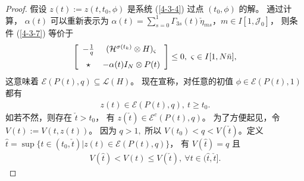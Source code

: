 \begin{proof}
    假设 $z(t):=z(t,t_0,\phi)$ 是系统 (\ref{4-3-4})  过点 $(t_0,\phi)$ 的解。 通过计算， $\alpha(t)$ 可以重新表示为 $\alpha(t)=\sum\limits_{s=0}^{1}\varGamma_{3 s}(t)\check{\eta}_{ms}$，$m\in I[1,\mathcal{J}_0]$， 则条件 (\ref{4-3-7}) 等价于
    \begin{align*} 
    \left[ \begin{array}{cc}
    -\frac{1}{q}&  (\mathcal{H}^{\sigma(t_k)}\otimes H)_\varsigma\vspace{0.2cm}\\
    \star&- \alpha(t)I_N\otimes  P(t)   \\
    \end{array}
    \right]\leq 0,\ \varsigma\in I[1,N\bar{n} ],
    \end{align*} 
    这意味着 
    $\mathscr{E} ( P(t),q)\subseteq \mathscr{L}(H)$。  现在宣称，对任意的初值 $\phi\in \mathscr{E}( P(t),1)$ 都有 
    \begin{align}\label{4-3-11} z(t)\in \mathscr{E}(P(t),q),\ t\geq t_0.
    \end{align} 
    如若不然，则存在 $\check{t}>t_0$， 有 $z(\check{t})\in \mathscr{E}^c( P(t),q)$。  为了方便起见，令 $V(t):= V(t,z(t))$。  因为 $q>1,$ 所以 $ V(t_0)<q<V(\check{t}) $。定义 $\hat{t}=\sup\{t\in(t_0,\check{t})|z(t)\in \mathscr{E}( P(t),q)\}$， 有 $V(\hat{t})=q$ 且
    \begin{align}\label{4-3-12}
    V(\hat{t})<V(t)\leq V(\check{t}),\ \forall t\in(\hat{t},\check{t}].
    \end{align}
    

\end{proof}
